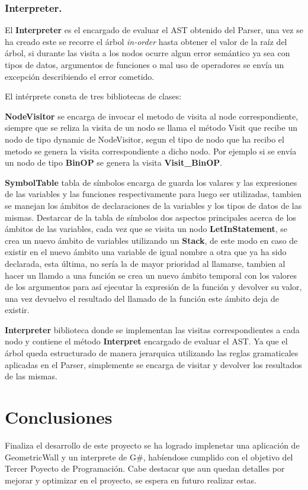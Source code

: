 \documentclass[a4paper,12pt]{article}
\begin{document}
	
	
	\subsubsection{Interpreter.}\label{sub:lexer}
	El \textbf{Interpreter} es el encargado de evaluar el AST obtenido del Parser, una vez se ha creado este se recorre el árbol \emph{in-order} hasta obtener el valor de la raíz del árbol, si durante las visita a los nodos ocurre algun error semántico ya sea con tipos de datos, argumentos de funciones o mal uso de operadores se envía un excepción describiendo el error cometido.
	
	El intérprete consta de tres bibliotecas de clases:
	
	\textbf{NodeVisitor} se encarga de invocar el metodo de visita al node correspondiente, siempre que se reliza la visita de un nodo se llama el método Visit que recibe un nodo de tipo dynamic de NodeVisitor, segun el tipo de nodo que ha recibo el metodo se genera la visita correspondiente a dicho nodo. Por ejemplo si se envía un nodo de tipo \textbf{BinOP} se genera la visita \textbf{Visit\_BinOP}.
	
	\textbf{SymbolTable} tabla de símbolos encarga de guarda los valares y las expresiones de las variables y las funciones respectivamente para luego ser utilizadas, tambien se manejan los ámbitos de declaraciones de la variables y los tipos de datos de las mismas. Destarcar de la tabla de símbolos dos aspectos principales acerca de los ámbitos de las variables, cada vez que se visita un nodo \textbf{LetInStatement}, se crea un nuevo ámbito de variables utilizando un \textbf{Stack}, de este modo en caso de existir en el nuevo ámbito una variable de igual nombre a otra que ya ha sido declarada, esta última, no sería la de mayor prioridad al llamarse, tambien al hacer un llamdo a una función se crea un nuevo ámbito temporal con los valores de los argumentos para así ejecutar la expresión de la función y devolver su valor, una vez devuelvo el resultado del llamado de la función este ámbito deja de existir.
	
	\textbf{Interpreter} biblioteca donde se implementan las visitas correspondientes a cada nodo y contiene el método \textbf{Interpret} encargado de evaluar el AST. Ya que el árbol queda estructurado de manera jerarquica utilizando las reglas gramaticales aplicadas en el Parser, simplemente se encarga de visitar y devolver los resultados de las mismas.
	
	\section{Conclusiones}\label{sec:conclusiones}
	Finaliza el desarrollo de este proyecto se ha logrado implenetar una aplicación de GeometricWall y un interprete de G\#, habíendose cumplido con el objetivo del Tercer Poyecto de Programación. Cabe destacar que aun quedan detalles por mejorar y optimizar en el proyecto, se espera en futuro realizar estas.
\end{document}
